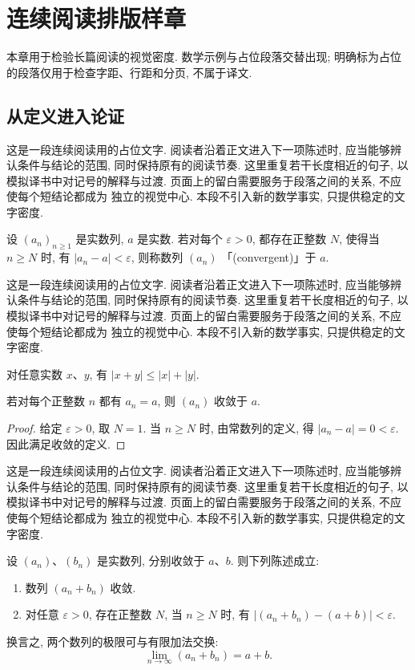 \chapter{连续阅读排版样章}
\label{ch:reading}
本章用于检验长篇阅读的视觉密度. 数学示例与占位段落交替出现;
明确标为占位的段落仅用于检查字距、行距和分页, 不属于译文.

\newcommand{\SampleParagraph}{%
    这是一段连续阅读用的占位文字. 阅读者沿着正文进入下一项陈述时,
    应当能够辨认条件与结论的范围, 同时保持原有的阅读节奏.
    这里重复若干长度相近的句子, 以模拟译书中对记号的解释与过渡.
    页面上的留白需要服务于段落之间的关系, 不应使每个短结论都成为
    独立的视觉中心. 本段不引入新的数学事实, 只提供稳定的文字密度.
    \par}
\section{从定义进入论证}
\SampleParagraph
\begin{definition}[实数列的极限]
    设 $(a_n)_{n \geq 1}$ 是实数列, $a$ 是实数.
    若对每个 $\varepsilon > 0$, 都存在正整数 $N$, 使得当 $n \geq N$ 时,
    有 $|a_n - a| < \varepsilon$, 则称数列 $(a_n)$
    「(convergent)」于 $a$.
\end{definition}
\SampleParagraph
\begin{lemma}[绝对值的基本估计]
    对任意实数 $x$、$y$, 有 $|x + y| \leq |x| + |y|$.
\end{lemma}
\begin{proposition}[常数列]
    若对每个正整数 $n$ 都有 $a_n = a$, 则 $(a_n)$ 收敛于 $a$.
\end{proposition}
\begin{proof}
    给定 $\varepsilon > 0$, 取 $N = 1$. 当 $n \geq N$ 时,
    由常数列的定义, 得 $|a_n - a| = 0 < \varepsilon$.
    因此满足收敛的定义.
\end{proof}
\SampleParagraph
\begin{theorem}
    \label{thm:sum-limit}
    设 $(a_n)$、$(b_n)$ 是实数列, 分别收敛于 $a$、$b$.
    则下列陈述成立:
    \begin{enumerate}
        \item
            数列 $(a_n + b_n)$ 收敛.
        \item
            对任意 $\varepsilon > 0$, 存在正整数 $N$, 当 $n \geq N$ 时,
            有 $|(a_n + b_n) - (a + b)| < \varepsilon$.
    \end{enumerate}
    换言之, 两个数列的极限可与有限加法交换:
    \[
        \lim_{n \to \infty} (a_n + b_n) = a + b.
    \]
\end{theorem}
